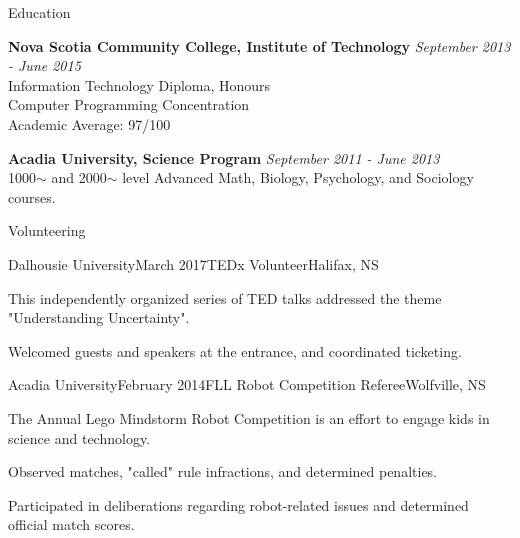 \documentclass{resume} %
\begin{document}
\pagebreak

\begin{rSection}{Education}

{\bf Nova Scotia Community College, Institute of Technology} \hfill {\em September 2013 - June 2015} \\ 
Information Technology Diploma, Honours \\
Computer Programming Concentration \smallskip \\
Academic Average: 97/100

{\bf Acadia University, Science Program} \hfill {\em September 2011 - June 2013} \\ 
1000$\sim$ and 2000$\sim$ level Advanced Math, Biology, Psychology, and Sociology courses.\\

\end{rSection}



\begin{rSection}{Volunteering}


\begin{rSubsection}{Dalhousie University}{March 2017}{TEDx Volunteer}{Halifax, NS}

\item[] This independently organized series of TED talks addressed the theme "Understanding Uncertainty".\smallskip


\item Welcomed guests and speakers at the entrance, and coordinated ticketing.
\end{rSubsection}

\begin{rSubsection}{Acadia University}{February 2014}{FLL Robot Competition Referee}{Wolfville, NS}

\item[] The Annual Lego Mindstorm Robot Competition is an effort to engage kids in science and technology.\smallskip

\item Observed matches, "called" rule infractions, and determined penalties. 
\item Participated in deliberations regarding robot-related issues and determined official match scores.
\end{rSubsection}

\end{rSection}
\end{document}
